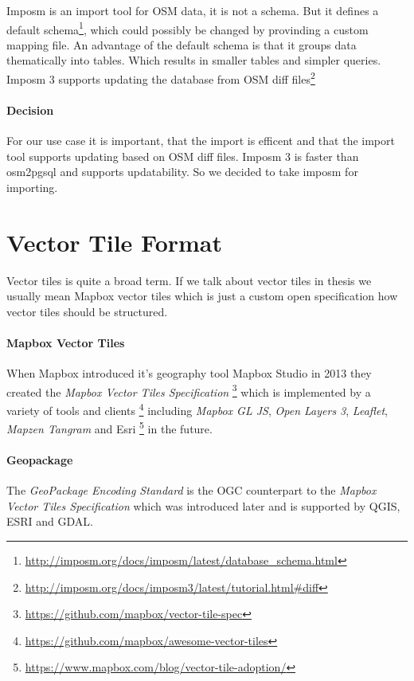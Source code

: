 Imposm is an import tool for OSM data, it is not a schema. But it
defines a default
schema\footnote{\url{http://imposm.org/docs/imposm/latest/database_schema.html}},
which could possibly be changed by provinding a custom mapping file. An
advantage of the default schema is that it groups data thematically into
tables. Which results in smaller tables and simpler queries. Imposm 3
supports updating the database from OSM diff
files\footnote{\url{http://imposm.org/docs/imposm3/latest/tutorial.html\#diff}}

\paragraph{Decision} For our use case it is important, that the import is efficent and that
the import tool supports updating based on OSM diff files. Imposm 3 is
faster than osm2pgsql and supports updatability. So we decided to take
imposm for importing.

\section{Vector Tile Format}\label{vector-tile-formats}

Vector tiles is quite a broad term. If we talk about vector tiles in thesis we usually mean Mapbox vector tiles which is just a custom open specification how vector tiles should be structured.

\paragraph{Mapbox Vector Tiles}

When Mapbox introduced it's geography tool Mapbox Studio in 2013 they
created the \emph{Mapbox Vector Tiles Specification}
\footnote{\url{https://github.com/mapbox/vector-tile-spec}} which is
implemented by a variety of tools and clients
\footnote{\url{https://github.com/mapbox/awesome-vector-tiles}}
including \emph{Mapbox GL JS}, \emph{Open Layers 3}, \emph{Leaflet},
\emph{Mapzen Tangram} and Esri
\footnote{\url{https://www.mapbox.com/blog/vector-tile-adoption/}} in
the future.

\paragraph{Geopackage}

The \emph{GeoPackage Encoding Standard} is the OGC counterpart to the
\emph{Mapbox Vector Tiles Specification} which was introduced later and
is supported by QGIS, ESRI and GDAL.

